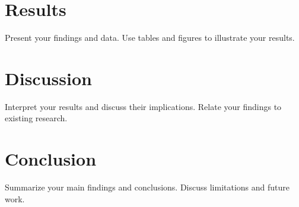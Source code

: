 \documentclass{article}
\begin{document}
	\section{Results}
	Present your findings and data. Use tables and figures to illustrate your results.
	
	\section{Discussion}
	Interpret your results and discuss their implications. Relate your findings to existing research.
	
	\section{Conclusion}
	Summarize your main findings and conclusions. Discuss limitations and future work.
	
	
	
\end{document}
